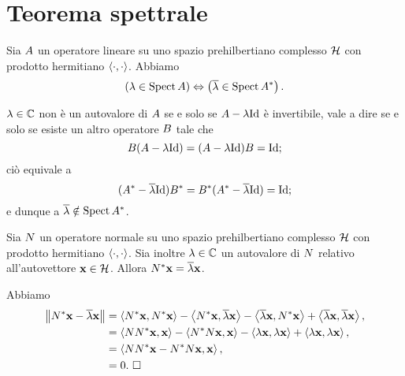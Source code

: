 \section{Teorema spettrale}
\label{SpaziVettorialiComplessi_TeoremaSpettrale}
\begin{Theorem}
  Sia $A$ un operatore lineare su uno spazio prehilbertiano
  complesso $\mathcal{H}$ con prodotto hermitiano
  $\left \langle \cdot , \cdot \right \rangle$.
  Abbiamo
  \[
    \left ( \lambda \in \operatorname{Spect}{A} \right ) \Leftrightarrow \left ( \overline{\lambda} \in \operatorname{Spect}{{A}^*} \right ).
  \]
\end{Theorem}
\Proof $\lambda \in \mathbb{C}$ non \`e un autovalore di $A$
se e solo se $\LinearOperator - \Eigenvalue\Identity$ \`e invertibile,
vale a dire
se e solo se esiste un altro operatore $B$ tale che
\[
  \VarLinearOperator(\LinearOperator - \Eigenvalue\Identity) =
  (\LinearOperator - \Eigenvalue\Identity)\VarLinearOperator =
  \Identity;
\]
ci\`o equivale a
\[
  (\Adjoint{\LinearOperator} - \Conjugate{\Eigenvalue}\Identity)
    \Adjoint{\VarLinearOperator} =
  \Adjoint{\VarLinearOperator}
    (\Adjoint{\LinearOperator} - \Conjugate{\Eigenvalue}\Identity) =
  \Identity;
\]
e dunque a
$\overline{\lambda} \notin \operatorname{Spect}{{A}^*}$.
\EndProof
\begin{Theorem}
  Sia $N$ un operatore normale su uno spazio prehilbertiano
  complesso $\mathcal{H}$ con prodotto hermitiano
  $\left \langle \cdot , \cdot \right \rangle$.
  Sia inoltre $\lambda \in \mathbb{C}$ un autovalore di $N$
  relativo all'autovettore $\Eigenvector \in \PrehilbertSpace$.
  Allora $\Adjoint{\NormalOperator} \Eigenvector
  = \Conjugate{\Eigenvalue} \Eigenvector$.
\end{Theorem}
\Proof Abbiamo
\begin{align*}
\Norm{\Adjoint{\NormalOperator}\Eigenvector-\Conjugate{\Eigenvalue}\Eigenvector}
  &= \HermitianProduct{\Adjoint{\NormalOperator}\Eigenvector}
        {\Adjoint{\NormalOperator}\Eigenvector}
    - \HermitianProduct{\Adjoint{\NormalOperator}\Eigenvector}
        {\Conjugate{\Eigenvalue}\Eigenvector}
    - \HermitianProduct{\Conjugate{\Eigenvalue}\Eigenvector}
        {\Adjoint{\NormalOperator}\Eigenvector}
    + \HermitianProduct{\Conjugate{\Eigenvalue}\Eigenvector}
        {\Conjugate{\Eigenvalue}\Eigenvector},\\
  &= \HermitianProduct{\NormalOperator\Adjoint{\NormalOperator}\Eigenvector}
        {\Eigenvector}
    - \HermitianProduct{\Adjoint{\NormalOperator}\NormalOperator\Eigenvector}
        {\Eigenvector}
    - \HermitianProduct{\Eigenvalue\Eigenvector}
        {\Eigenvalue\Eigenvector}
    + \HermitianProduct{\Eigenvalue\Eigenvector}
        {\Eigenvalue\Eigenvector},\\
  &= \HermitianProduct{\NormalOperator\Adjoint{\NormalOperator}\Eigenvector
        - \Adjoint{\NormalOperator}\NormalOperator\Eigenvector}
        {\Eigenvector},\\
  &= 0.\text{ \EndProof}
\end{align*}
